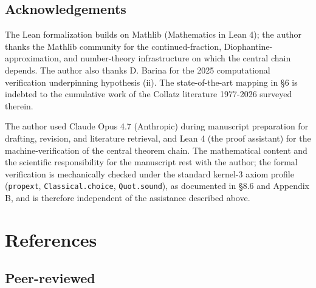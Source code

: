\documentclass[
  11pt]{amsart}
\theoremstyle{plain}
\theoremstyle{definition}
\theoremstyle{remark}
\begin{document}
\subsection*{Acknowledgements}\label{acknowledgements}

The Lean formalization builds on Mathlib (Mathematics in Lean 4); the
author thanks the Mathlib community for the continued-fraction,
Diophantine-approximation, and number-theory infrastructure on which the
central chain depends. The author also thanks D. Barina for the 2025
computational verification underpinning hypothesis (ii). The
state-of-the-art mapping in §6 is indebted to the cumulative work of the
Collatz literature 1977-2026 surveyed therein.

The author used Claude Opus 4.7 (Anthropic) during manuscript
preparation for drafting, revision, and literature retrieval, and Lean 4
(the proof assistant) for the machine-verification of the central
theorem chain. The mathematical content and the scientific
responsibility for the manuscript rest with the author; the formal
verification is mechanically checked under the standard kernel-3 axiom
profile (\texttt{propext}, \texttt{Classical.choice},
\texttt{Quot.sound}), as documented in §8.6 and Appendix B, and is
therefore independent of the assistance described above.

\section{References}\label{references}

\subsection*{Peer-reviewed}\label{peer-reviewed}
\end{document}
